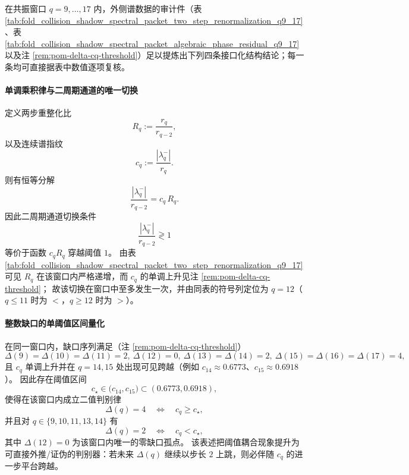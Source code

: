 \begin{remark}\label{rem:pom-resonance-window-final-structural-conclusions}
在共振窗口 \(q=9,\dots,17\) 内，外侧谱数据的审计件（表 \ref{tab:fold_collision_shadow_spectral_packet_two_step_renormalization_q9_17}、表 \ref{tab:fold_collision_shadow_spectral_packet_algebraic_phase_residual_q9_17} 以及注 \ref{rem:pom-delta-cq-threshold}）足以提炼出下列四条接口化结构结论；每一条均可直接据表中数值逐项复核。
\par

\paragraph{单调乘积律与二周期通道的唯一切换}
定义两步重整化比
\[
R_q:=\frac{r_q}{r_{q-2}},
\]
以及连续谱指纹
\[
c_q:=\frac{|\lambda_q^-|}{r_q}.
\]
则有恒等分解
\[
\frac{|\lambda_q^-|}{r_{q-2}}=c_q\,R_q.
\]
因此二周期通道切换条件
\[
\frac{|\lambda_q^-|}{r_{q-2}}\gtrless 1
\]
等价于函数 \(c_qR_q\) 穿越阈值 \(1\)。
由表 \ref{tab:fold_collision_shadow_spectral_packet_two_step_renormalization_q9_17} 可见 \(R_q\) 在该窗口内严格递增，而 \(c_q\) 的单调上升见注 \ref{rem:pom-delta-cq-threshold}；
故该切换在窗口中至多发生一次，并由同表的符号列定位为 \(q=12\)（\(q\le 11\) 时为 \(<\)，\(q\ge 12\) 时为 \(>\)）。
\par

\paragraph{整数缺口的单阈值区间量化}
在同一窗口内，缺口序列满足（注 \ref{rem:pom-delta-cq-threshold}）
\[
\Delta(9)=\Delta(10)=\Delta(11)=2,\ \Delta(12)=0,\ \Delta(13)=\Delta(14)=2,\ \Delta(15)=\Delta(16)=\Delta(17)=4,
\]
且 \(c_q\) 单调上升并在 \(q=14,15\) 处出现可见跨越（例如 \(c_{14}\approx 0.6773\)、\(c_{15}\approx 0.6918\)）。
因此存在阈值区间
\[
c_\star\in\bigl(c_{14},c_{15}\bigr)\subset(0.6773,0.6918),
\]
使得在该窗口内成立二值判别律
\[
\Delta(q)=4\quad\Longleftrightarrow\quad c_q\ge c_\star,
\]
并且对 \(q\in\{9,10,11,13,14\}\) 有
\[
\Delta(q)=2\quad\Longleftrightarrow\quad c_q<c_\star,
\]
其中 \(\Delta(12)=0\) 为该窗口内唯一的零缺口孤点。
该表述把阈值耦合现象提升为可直接外推/证伪的判别器：若未来 \(\Delta(q)\) 继续以步长 \(2\) 上跳，则必伴随 \(c_q\) 的进一步平台跨越。
\par


\end{remark}

